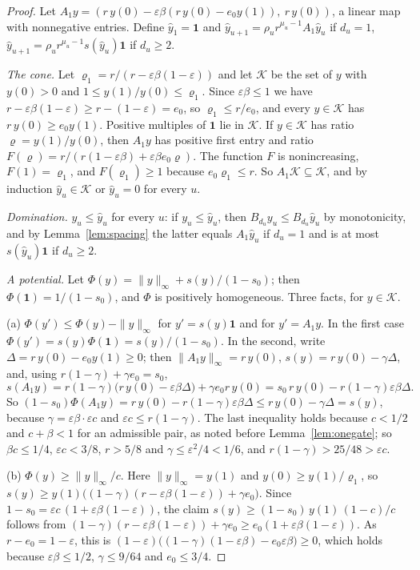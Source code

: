\documentclass[11pt]{amsart}
\theoremstyle{definition}
\theoremstyle{remark}
\newcommand{\eps}{\varepsilon}
\begin{document}
\begin{proof}
Let $A_1y=(r\,y(0)-\eps\beta(r\,y(0)-e_0y(1)),\ r\,y(0))$, a linear map with nonnegative entries.
Define $\hat y_1=\mathbf 1$ and $\hat y_{u+1}=\rho_ur^{\mu_u-1}A_1\hat y_u$ if $d_u=1$,
$\hat y_{u+1}=\rho_ur^{\mu_u-1}s(\hat y_u)\mathbf 1$ if $d_u\ge2$.

\emph{The cone.} Let $\varrho_1=r/(r-\eps\beta(1-\eps))$ and let $\mathcal K$ be the set of $y$ with
$y(0)>0$ and $1\le y(1)/y(0)\le\varrho_1$. Since $\eps\beta\le1$ we have
$r-\eps\beta(1-\eps)\ge r-(1-\eps)=e_0$, so $\varrho_1\le r/e_0$, and every $y\in\mathcal K$ has
$r\,y(0)\ge e_0y(1)$. Positive multiples of $\mathbf 1$ lie in $\mathcal K$. If $y\in\mathcal K$
has ratio $\varrho=y(1)/y(0)$, then $A_1y$ has positive first entry and ratio
$F(\varrho)=r/(r(1-\eps\beta)+\eps\beta e_0\varrho)$. The function $F$ is nonincreasing,
$F(1)=\varrho_1$, and $F(\varrho_1)\ge1$ because $e_0\varrho_1\le r$. So $A_1\mathcal K\subseteq\mathcal K$,
and by induction $\hat y_u\in\mathcal K$ or $\hat y_u=0$ for every $u$.

\emph{Domination.} $y_u\le\hat y_u$ for every $u$: if $y_u\le\hat y_u$, then
$B_{d_u}y_u\le B_{d_u}\hat y_u$ by monotonicity, and by Lemma~\ref{lem:spacing} the latter
equals $A_1\hat y_u$ if $d_u=1$ and is at most $s(\hat y_u)\mathbf 1$ if $d_u\ge2$.

\emph{A potential.} Let $\Phi(y)=\|y\|_\infty+s(y)/(1-s_0)$; then $\Phi(\mathbf 1)=1/(1-s_0)$, and
$\Phi$ is positively homogeneous. Three facts, for $y\in\mathcal K$.

(a) $\Phi(y')\le\Phi(y)-\|y\|_\infty$ for $y'=s(y)\mathbf 1$ and for $y'=A_1y$. In the first case
$\Phi(y')=s(y)\Phi(\mathbf 1)=s(y)/(1-s_0)$. In the second, write $\Delta=r\,y(0)-e_0y(1)\ge0$; then
$\|A_1y\|_\infty=r\,y(0)$, $s(y)=r\,y(0)-\gamma\Delta$, and, using $r(1-\gamma)+\gamma e_0=s_0$,
\[
s(A_1y)=r(1-\gamma)\bigl(r\,y(0)-\eps\beta\Delta\bigr)+\gamma e_0r\,y(0)=s_0\,r\,y(0)-r(1-\gamma)\eps\beta\Delta .
\]
So $(1-s_0)\Phi(A_1y)=r\,y(0)-r(1-\gamma)\eps\beta\Delta\le r\,y(0)-\gamma\Delta=s(y)$, because
$\gamma=\eps\beta\cdot\eps c$ and $\eps c\le r(1-\gamma)$. The last inequality holds because $c<1/2$
and $c+\beta<1$ for an admissible pair, as noted before Lemma~\ref{lem:onegate}; so
$\beta c\le1/4$, $\eps c<3/8$, $r>5/8$ and $\gamma\le\eps^2/4<1/6$, and $r(1-\gamma)>25/48>\eps c$.

(b) $\Phi(y)\ge\|y\|_\infty/c$. Here $\|y\|_\infty=y(1)$ and $y(0)\ge y(1)/\varrho_1$, so
$s(y)\ge y(1)\bigl((1-\gamma)(r-\eps\beta(1-\eps))+\gamma e_0\bigr)$. Since
$1-s_0=\eps c\,(1+\eps\beta(1-\eps))$, the claim $s(y)\ge(1-s_0)\,y(1)\,(1-c)/c$ follows from
$(1-\gamma)(r-\eps\beta(1-\eps))+\gamma e_0\ge e_0(1+\eps\beta(1-\eps))$. As $r-e_0=1-\eps$, this is
$(1-\eps)\bigl((1-\gamma)(1-\eps\beta)-e_0\eps\beta\bigr)\ge0$, which holds because
$\eps\beta\le1/2$, $\gamma\le9/64$ and $e_0\le3/4$.


\end{proof}
\end{document}
